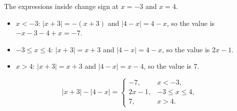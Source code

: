 The expressions inside change sign at $x=-3$ and $x=4$.
\begin{itemize}
\item $x<-3$: $|x+3|=-(x+3)$ and $|4-x|=4-x$, so the value is $-x-3-4+x=-7$.
\item $-3\le x\le4$: $|x+3|=x+3$ and $|4-x|=4-x$, so the value is $2x-1$.
\item $x>4$: $|x+3|=x+3$ and $|4-x|=x-4$, so the value is $7$.
\end{itemize}
\[
\boxed{|x+3|-|4-x|=\begin{cases}-7,&x<-3,\\ 2x-1,&-3\le x\le4,\\ 7,&x>4.\end{cases}}
\]
